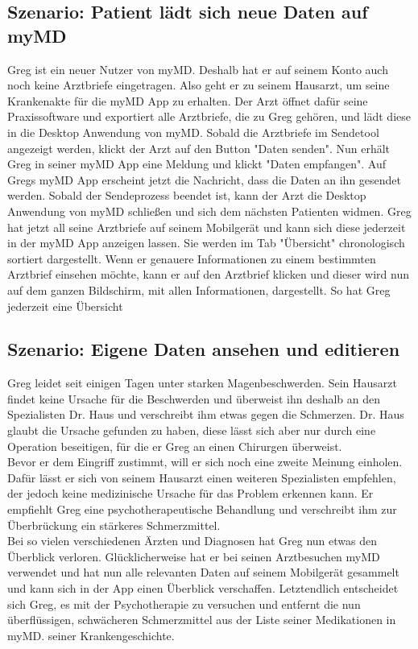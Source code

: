 \documentclass[a4paper]{scrreprt}
\begin{document}
\subsection{Szenario: Patient lädt sich neue Daten auf myMD}
Greg ist ein neuer Nutzer von myMD. Deshalb hat er auf seinem Konto auch noch keine Arztbriefe eingetragen. Also geht er zu seinem Hausarzt, um seine Krankenakte für die myMD \gls{App} zu erhalten. Der Arzt öffnet dafür seine Praxissoftware und exportiert alle Arztbriefe, die zu Greg gehören, und lädt diese in die \gls{Desktop Anwendung} von myMD. Sobald die Arztbriefe im Sendetool angezeigt werden, klickt der Arzt auf den Button "Daten senden". Nun erhält Greg in seiner myMD \gls{App} eine Meldung und klickt "Daten empfangen". Auf Gregs myMD \gls{App} erscheint jetzt die Nachricht, dass die Daten an ihn gesendet werden. Sobald der Sendeprozess beendet ist, kann der Arzt die \gls{Desktop Anwendung} von myMD schließen und sich dem nächsten Patienten widmen. Greg hat jetzt all seine Arztbriefe auf seinem Mobilgerät und kann sich diese jederzeit in der myMD \gls{App} anzeigen lassen. Sie werden im Tab "Übersicht" chronologisch sortiert dargestellt. Wenn er genauere Informationen zu einem bestimmten Arztbrief einsehen möchte, kann er auf den Arztbrief klicken und dieser wird nun auf dem ganzen Bildschirm, mit allen Informationen, dargestellt. So hat Greg jederzeit eine Übersicht

\subsection{Szenario: Eigene Daten ansehen und editieren}
Greg leidet seit einigen Tagen unter starken Magenbeschwerden. Sein Hausarzt findet keine Ursache für die Beschwerden und überweist ihn deshalb an den Spezialisten Dr. Haus und verschreibt ihm etwas gegen die Schmerzen. Dr. Haus glaubt die Ursache gefunden zu haben, diese lässt sich aber nur durch eine Operation beseitigen, für die er Greg an einen Chirurgen überweist. \\
Bevor er dem Eingriff zustimmt, will er sich noch eine zweite Meinung einholen. Dafür lässt er sich von seinem Hausarzt einen weiteren Spezialisten empfehlen, der jedoch keine medizinische Ursache für das Problem erkennen kann. Er empfiehlt Greg eine psychotherapeutische Behandlung und verschreibt ihm zur Überbrückung ein stärkeres Schmerzmittel. \\ 
Bei so vielen verschiedenen Ärzten und Diagnosen hat Greg nun etwas den Überblick verloren. Glücklicherweise hat er bei seinen Arztbesuchen myMD verwendet und hat nun alle relevanten Daten auf seinem Mobilgerät gesammelt und kann sich in der App einen Überblick verschaffen. Letztendlich entscheidet sich Greg, es mit der Psychotherapie zu versuchen und entfernt die nun überflüssigen, schwächeren Schmerzmittel aus der Liste seiner Medikationen in myMD. seiner Krankengeschichte.
\end{document}
